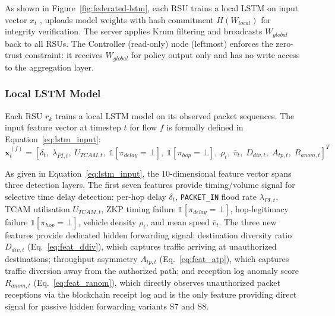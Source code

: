 \documentclass[12pt, a4paper]{report}
\begin{document}
As shown in Figure~\ref{fig:federated-lstm}, each RSU trains a
local LSTM on input vector $x_t$ , uploads model weights with hash
commitment $H(W_{local})$ for integrity verification. The server
applies Krum filtering and broadcasts $W_{global}$ back to all RSUs.
The Controller (read-only) node (leftmost) enforces the zero-trust
constraint: it receives $W_{global}$ for policy output only and has
no write access to the aggregation layer.

\subsubsection{Local LSTM Model}
Each RSU $r_k$ trains a local LSTM model on its observed packet
sequences. The input feature vector at timestep $t$ for flow $f$
is formally defined in Equation~\eqref{eq:lstm_input}:
\begin{equation}
\mathbf{x}_t^{(f)} = \left[
\delta_t,\;
\lambda_{PI,t},\;
U_{TCAM,t},\;
\mathbb{1}[\pi_{delay}{=}\bot],\;
\mathbb{1}[\pi_{hop}{=}\bot],\;
\rho_t,\;
\bar{v}_t,\;
D_{div,t},\;
A_{tp,t},\;
R_{anom,t}
\right]^T
\label{eq:lstm_input}
\end{equation}

As given in Equation~\eqref{eq:lstm_input}, the
10-dimensional feature vector spans three detection
layers. The first seven features provide
timing/volume signal for selective time delay
detection: per-hop delay $\delta_t$,
\texttt{PACKET\_IN} flood rate $\lambda_{PI,t}$,
\ac{TCAM} utilisation $U_{TCAM,t}$, \ac{ZKP} timing
failure $\mathbb{1}[\pi_{delay}{=}\bot]$,
hop-legitimacy failure $\mathbb{1}[\pi_{hop}{=}\bot]$,
vehicle density $\rho_t$, and mean speed $\bar{v}_t$.
The three new features provide dedicated hidden
forwarding signal: destination diversity ratio
$D_{div,t}$ (Eq.~\ref{eq:feat_ddiv}), which captures
traffic arriving at unauthorized destinations;
throughput asymmetry $A_{tp,t}$
(Eq.~\ref{eq:feat_atp}), which captures traffic
diversion away from the authorized path; and
reception log anomaly score $R_{anom,t}$
(Eq.~\ref{eq:feat_ranom}), which directly observes
unauthorized packet receptions via the blockchain
receipt log and is the only feature providing
direct signal for passive hidden forwarding variants
S7 and S8.
\end{document}
